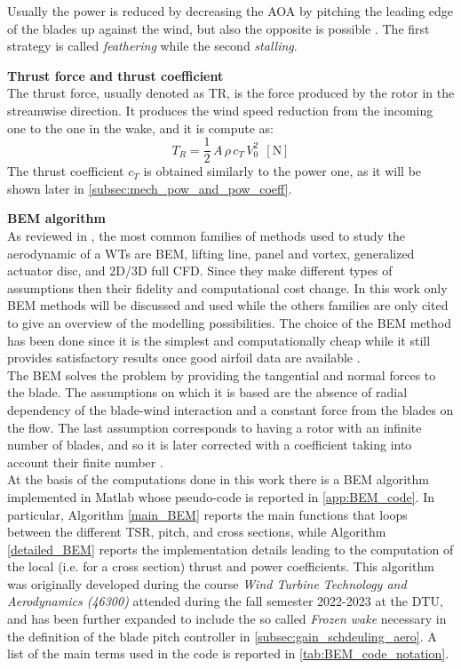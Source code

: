 Usually the power is reduced by decreasing the \acrshort{AOA} by pitching the leading edge of the blades up against the wind, but also the opposite is possible \cite{Aerodynamics_of_wind_turbines}. The first strategy is called \textit{feathering} while the second \textit{stalling}.

\textbf{Thrust force and thrust coefficient}\\
The thrust force, usually denoted as \acrshort{TR}, is the force produced by the rotor in the streamwise direction. It produces the wind speed reduction from the incoming one to the one in the wake, and it is compute as:
\begin{equation}
    T_R = \frac{1}{2} \, A \, \rho \, c_T \, V_0^2 \ \ \left[\si{\newton}\right]
    \label{eq:thrust_coeff}
\end{equation}
The thrust coefficient $c_T$ is obtained similarly to the power one, as it will be shown later in \autoref{subsec:mech_pow_and_pow_coeff}.

\textbf{BEM algorithm}\\
As reviewed in \cite{HANSEN2006285}, the most common families of methods used to study the aerodynamic of a WTs are \acrfull{BEM}, lifting line, panel and vortex, generalized actuator disc, and 2D/3D full CFD. Since they make different types of assumptions then their fidelity and computational cost change. In this work only \acrshort{BEM} methods will be discussed and used while the others families are only cited to give an overview of the modelling possibilities. The choice of the BEM method has been done since it is the simplest and computationally cheap while it still provides satisfactory results once good airfoil data are available \cite{HANSEN2006285}.\\
The \acrshort{BEM} solves the problem by providing the tangential and normal forces to the blade. The assumptions on which it is based are the absence of radial dependency of the blade-wind interaction and a constant force from the blades on the flow. The last assumption corresponds to having a rotor with an infinite number of blades, and so it is later corrected with a coefficient taking into account their finite number \cite{Aerodynamics_of_wind_turbines}.\\
At the basis of the computations done in this work there is a \acrshort{BEM} algorithm implemented in Matlab whose pseudo-code is reported in \autoref{app:BEM_code}. In particular, Algorithm \ref{main_BEM} reports the main functions that loops between the different TSR, pitch, and cross sections, while Algorithm \ref{detailed_BEM} reports the implementation details leading to the computation of the local (i.e. for a cross section) thrust and power coefficients. This algorithm was originally developed during the course \textit{Wind Turbine Technology and Aerodynamics (46300)} attended during the fall semester 2022-2023 at the \acrfull{DTU}, and has been further expanded to include the so called \textit{Frozen wake} necessary in the definition of the blade pitch controller in \autoref{subsec:gain_schdeuling_aero}. A list of the main terms used in the code is reported in \autoref{tab:BEM_code_notation}.

